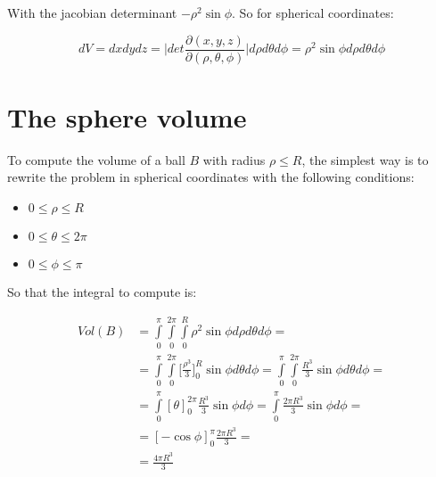 With the jacobian determinant $-\rho^2\sin\phi$.
So for spherical coordinates:

$$dV = dxdydz = \biggl|det\frac{\partial(x,y,z)}{\partial(\rho,\theta,\phi)}\biggr|d\rho d\theta d\phi = \rho^2\sin\phi d\rho d\theta d\phi$$

\section{The sphere volume}
To compute the volume of a ball $B$ with radius $\rho\le R$, the simplest way is to rewrite the problem in spherical coordinates with the following conditions:

\begin{multicols}{3}
	\begin{itemize}
		\item $0\le \rho\le R$
		\item $0 \le \theta\le 2\pi$
		\item $0 \le \phi\le \pi$
	\end{itemize}
\end{multicols}

So that the integral to compute is:

\begin{align*}
	Vol(B) &= \int\limits_0^\pi\int\limits_0^{2\pi}\int\limits_{0}^R \rho^2\sin\phi d\rho d\theta d\phi=\\
				 &=\int\limits_0^\pi\int\limits_0^{2\pi}\biggl[\frac{\rho^3}{3}\biggr]_0^R\sin\phi d\theta d\phi = \int\limits_0^\pi\int\limits_0^{2\pi}\frac{R^3}{3}\sin\phi d\theta d\phi=\\
				 &=\int\limits_0^\pi[\theta]_0^{2\pi}\frac{R^3}{3}\sin\phi d\phi = \int\limits_0^\pi\frac{2\pi R^3}{3}\sin\phi d\phi = \\
				 &= [-\cos\phi]_0^\pi\frac{2\pi R^3}{3}=\\
				 &=\frac{4\pi R^3}{3}
\end{align*}
